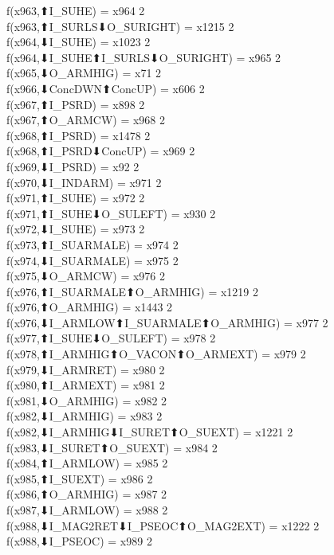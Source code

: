 f(x963,⬆I_SUHE) = x964 {2} \\
f(x963,⬆I_SURLS⬇O_SURIGHT) = x1215 {2} \\
f(x964,⬇I_SUHE) = x1023 {2} \\
f(x964,⬇I_SUHE⬆I_SURLS⬇O_SURIGHT) = x965 {2} \\
f(x965,⬇O_ARMHIG) = x71 {2} \\
f(x966,⬇ConcDWN⬆ConcUP) = x606 {2} \\
f(x967,⬆I_PSRD) = x898 {2} \\
f(x967,⬆O_ARMCW) = x968 {2} \\
f(x968,⬆I_PSRD) = x1478 {2} \\
f(x968,⬆I_PSRD⬇ConcUP) = x969 {2} \\
f(x969,⬇I_PSRD) = x92 {2} \\
f(x970,⬇I_INDARM) = x971 {2} \\
f(x971,⬆I_SUHE) = x972 {2} \\
f(x971,⬆I_SUHE⬇O_SULEFT) = x930 {2} \\
f(x972,⬇I_SUHE) = x973 {2} \\
f(x973,⬆I_SUARMALE) = x974 {2} \\
f(x974,⬇I_SUARMALE) = x975 {2} \\
f(x975,⬇O_ARMCW) = x976 {2} \\
f(x976,⬆I_SUARMALE⬆O_ARMHIG) = x1219 {2} \\
f(x976,⬆O_ARMHIG) = x1443 {2} \\
f(x976,⬇I_ARMLOW⬆I_SUARMALE⬆O_ARMHIG) = x977 {2} \\
f(x977,⬆I_SUHE⬇O_SULEFT) = x978 {2} \\
f(x978,⬆I_ARMHIG⬆O_VACON⬆O_ARMEXT) = x979 {2} \\
f(x979,⬇I_ARMRET) = x980 {2} \\
f(x980,⬆I_ARMEXT) = x981 {2} \\
f(x981,⬇O_ARMHIG) = x982 {2} \\
f(x982,⬇I_ARMHIG) = x983 {2} \\
f(x982,⬇I_ARMHIG⬇I_SURET⬆O_SUEXT) = x1221 {2} \\
f(x983,⬇I_SURET⬆O_SUEXT) = x984 {2} \\
f(x984,⬆I_ARMLOW) = x985 {2} \\
f(x985,⬆I_SUEXT) = x986 {2} \\
f(x986,⬆O_ARMHIG) = x987 {2} \\
f(x987,⬇I_ARMLOW) = x988 {2} \\
f(x988,⬇I_MAG2RET⬇I_PSEOC⬆O_MAG2EXT) = x1222 {2} \\
f(x988,⬇I_PSEOC) = x989 {2} \\
